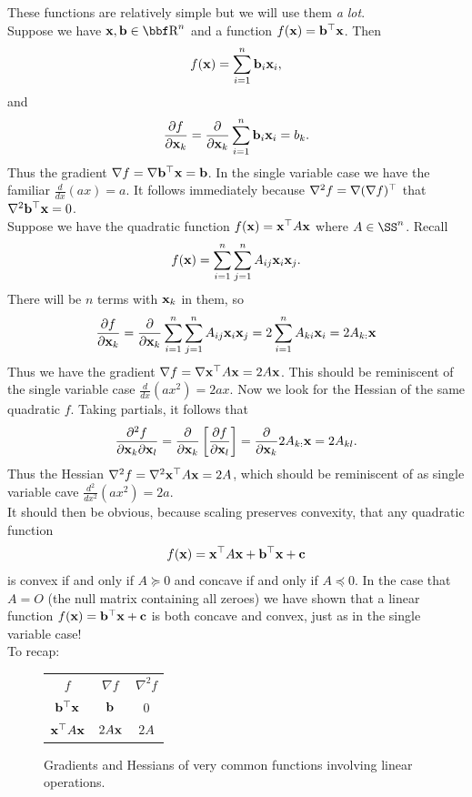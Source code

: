 \documentclass{article}
\begin{document}
These functions are relatively simple but we will use them \textit{a lot}.\\
Suppose we have $\xx,\bb\in\RR^n$ and a function $f({\bf x}) = {\bf b}^\top{\bf x}$.
Then
\[
    f({\bf x}) = \sum_{i=1}^n {\bf b}_i{\bf x}_i,
\]
and
\[
    \frac{\partial f}{\partial {\bf x}_k} = \frac{\partial}{\partial {\bf x}_k} \sum_{i=1}^n {\bf b}_i{\bf x}_i = b_k.
\]
Thus the gradient $\nabla f = \nabla {\bf b}^\top{\bf x} = {\bf b}$. In the single variable case
we have the familiar $\frac{d}{dx}(ax) = a$. It follows immediately because $\nabla^2 f
= \nabla (\nabla f)^\top$ that $\nabla^2 {\bf b}^\top{\bf x} = 0$.\\

Suppose we have the quadratic function $f({\bf x}) = {\bf x}^\top A{\bf x}$ where $A\in\SS^n$. Recall
\[
    f({\bf x}) = \sum_{i=1}^n\sum_{j=1}^n A_{ij}{\bf x}_i{\bf x}_j.
\]
There will be $n$ terms with ${\bf x}_k$ in them, so
\[
    \frac{\partial f}{\partial {\bf x}_k} = \frac{\partial}{\partial {\bf x}_k} \sum_{i=1}^n\sum_{j=1}^n A_{ij}{\bf x}_i{\bf x}_j = 2\sum_{i=1}^nA_{ki}{\bf x}_i = 2A_{k:}{\bf x}
\]
Thus we have the gradient $\nabla f = \nabla {\bf x}^\top A{\bf x} = 2A{\bf x}$. This should be reminiscent
of the single variable case $\frac{d}{dx}(ax^2) = 2ax$. Now we look for the Hessian of the
same quadratic $f$. Taking partials, it follows that
\[
    \frac{\partial^2 f}{\partial {\bf x}_k\partial {\bf x}_l} = \frac{\partial}{\partial {\bf x}_k}\left[ \frac{\partial f}{\partial {\bf x}_l} \right] = \frac{\partial}{\partial {\bf x}_k} 2A_{k:}{\bf x} = 2A_{kl}.
\]
Thus the Hessian $\nabla^2 f = \nabla^2 {\bf x}^\top A{\bf x} = 2A$, which should be reminiscent of
as single variable cave $\frac{d^2}{dx^2}(ax^2) = 2a$.\\

It should then be obvious, because scaling preserves convexity, that any quadratic function
\[
    f({\bf x}) = {\bf x}^\top A{\bf x} + {\bf b}^\top{\bf x} + {\bf c}
\]
is convex if and only if $A \succeq 0$ and concave if and only if $A \preceq 0$. In the case
that $A=O$ (the null matrix containing all zeroes) we have shown that a linear function
$f({\bf x}) = {\bf b}^\top{\bf x} + {\bf c}$ is both concave and convex, just as in the single variable case!\\

To recap:
\begin{figure}[htpb]
    \centering
    \begin{tabular}{c|c|c}
        $f$ & $\nabla f$ & $\nabla^2 f$\\
        ${\bf b}^\top{\bf x}$ & ${\bf b}$ & $0$\\
        ${\bf x}^\top A{\bf x}$ & $2A{\bf x}$ & $2A$
    \end{tabular}
    \caption{Gradients and Hessians of very common functions
    involving linear operations.}
    \label{table:derivs}
\end{figure}
\end{document}
